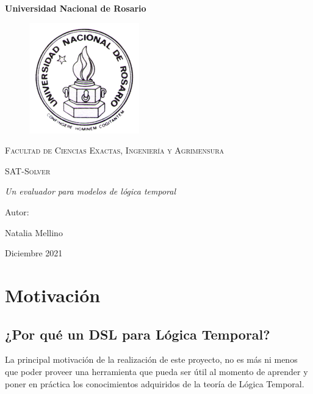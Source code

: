 \documentclass[11pt]{article}
\begin{document}

\begin{titlepage}
    \centering
    {\bfseries\LARGE Universidad Nacional de Rosario \par}
    \begin{figure}[h!]
        \begin{center}
            \includegraphics[]{unr.png}
        \end{center}
      \end{figure}
    \vspace{1cm}
    {\scshape\Large Facultad de Ciencias Exactas, Ingeniería y Agrimensura \par}
    \vspace{3cm}
    {\scshape\Huge SAT-Solver \par}
    \vspace{3cm}
    {\itshape\Large Un evaluador para modelos de lógica temporal \par}
    \vfill
    {\Large Autor: \par}
    {\Large Natalia Mellino \par}
    \vfill
    {\Large Diciembre 2021 \par}
\end{titlepage}

\tableofcontents

\newpage

\section{Motivación}

\subsection{¿Por qué un DSL para Lógica Temporal?}

La principal motivación de la realización de este proyecto, no es más ni menos
que poder proveer una herramienta que pueda ser útil al momento de aprender y
poner en práctica los conocimientos adquiridos de la teoría de Lógica Temporal. \\
\end{document}

